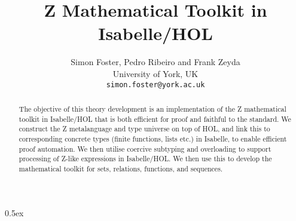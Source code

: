 \documentclass[11pt,a4paper]{article}
\begin{document}
\title{Z Mathematical Toolkit in Isabelle/HOL}
\author{Simon Foster, Pedro Ribeiro and Frank Zeyda \\[.5ex] University of York, UK \\[2ex] \texttt{\small simon.foster@york.ac.uk}}
\maketitle

\begin{abstract}
\noindent The objective of this theory development is an implementation of the Z mathematical 
toolkit in Isabelle/HOL that is both efficient for proof and faithful to the standard.
We construct the Z metalanguage and type universe on top of HOL, and link this to
corresponding concrete types (finite functions, lists etc.) in Isabelle, to enable
efficient proof automation. We then utilise coercive subtyping and overloading to
support processing of Z-like expressions in Isabelle/HOL. We then use this to develop
the mathematical toolkit for sets, relations, functions, and sequences.
\end{abstract}

\tableofcontents
\newpage

\parindent 0pt\parskip 0.5ex





\end{document}
